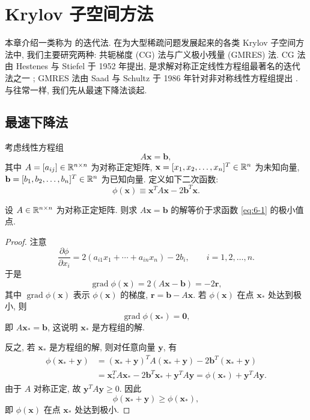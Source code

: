 \chapter{Krylov 子空间方法}
\label{ch:krylov}

本章介绍一类称为 的迭代法. 在为大型稀疏问题发展起来的各类 Krylov 子空间方法中, 我们主要研究两种: 共轭梯度 (CG) 法与广义极小残量 (GMRES) 法. CG 法由 Hestenes 与 Stiefel 于 1952 年提出, 是求解对称正定线性方程组最著名的迭代法之一 \cite{src:37}; GMRES 法由 Saad 与 Schultz 于 1986 年针对非对称线性方程组提出 \cite{src:71}. 与往常一样, 我们先从最速下降法谈起.

\section{最速下降法}
\label{sec:6-1}

考虑线性方程组
\[
  A\mathbf{x}=\mathbf{b},
\]
其中 $A=[a_{ij}]\in\mathbb{R}^{n\times n}$ 为对称正定矩阵, $\mathbf{x}=[x_1,x_2,\ldots,x_n]^T\in\mathbb{R}^n$ 为未知向量, $\mathbf{b}=[b_1,b_2,\ldots,b_n]^T\in\mathbb{R}^n$ 为已知向量. 定义如下二次函数:
\begin{equation}
  \phi(\mathbf{x})\equiv\mathbf{x}^TA\mathbf{x}-2\mathbf{b}^T\mathbf{x}.
  \label{eq:6-1}
\end{equation}

\begin{theorem}
\label{thm:6-1}
设 $A\in\mathbb{R}^{n\times n}$ 为对称正定矩阵. 则求 $A\mathbf{x}=\mathbf{b}$ 的解等价于求函数 \eqref{eq:6-1} 的极小值点.
\end{theorem}

\begin{proof}
注意
\[
  \frac{\partial\phi}{\partial x_i}
  =2(a_{i1}x_1+\cdots+a_{in}x_n)-2b_i,
  \qquad i=1,2,\ldots,n.
\]
于是
\begin{equation}
  \operatorname{grad}\phi(\mathbf{x})=2(A\mathbf{x}-\mathbf{b})=-2\mathbf{r},
  \label{eq:6-2}
\end{equation}
其中 $\operatorname{grad}\phi(\mathbf{x})$ 表示 $\phi(\mathbf{x})$ 的梯度, $\mathbf{r}=\mathbf{b}-A\mathbf{x}$. 若 $\phi(\mathbf{x})$ 在点 $\mathbf{x}_*$ 处达到极小, 则
\[
  \operatorname{grad}\phi(\mathbf{x}_*)=\mathbf{0},
\]
即 $A\mathbf{x}_*=\mathbf{b}$, 这说明 $\mathbf{x}_*$ 是方程组的解.

反之, 若 $\mathbf{x}_*$ 是方程组的解, 则对任意向量 $\mathbf{y}$, 有
\[
  \begin{aligned}
    \phi(\mathbf{x}_*+\mathbf{y})
    &=(\mathbf{x}_*+\mathbf{y})^TA(\mathbf{x}_*+\mathbf{y})
      -2\mathbf{b}^T(\mathbf{x}_*+\mathbf{y})\\
    &=\mathbf{x}_*^TA\mathbf{x}_*-2\mathbf{b}^T\mathbf{x}_*+\mathbf{y}^TA\mathbf{y}
     =\phi(\mathbf{x}_*)+\mathbf{y}^TA\mathbf{y}.
  \end{aligned}
\]
由于 $A$ 对称正定, 故 $\mathbf{y}^TA\mathbf{y}\geqslant0$. 因此
\[
  \phi(\mathbf{x}_*+\mathbf{y})\geqslant\phi(\mathbf{x}_*),
\]
即 $\phi(\mathbf{x})$ 在点 $\mathbf{x}_*$ 处达到极小.
\end{proof}

